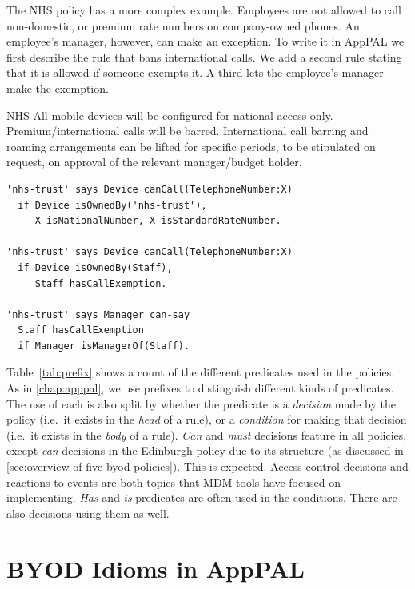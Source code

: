 \documentclass[thesis.tex]{subfiles}
\begin{document}
The NHS policy has a more complex example. Employees are not
allowed to call non-domestic, or premium rate numbers on company-owned
phones. An employee's manager, however, can make an exception.
To write it in AppPAL we first describe the
rule that bans international calls. We add a second rule stating that it is
allowed if someone exempts it. A third lets the employee's manager 
make the exemption.

\noindent\begin{minipage}{\linewidth}\vspace{1em}
\begin{policyrule}{NHS}
  All mobile devices will be configured for national access only. Premium/international calls will be barred.
  International call barring and roaming arrangements can be lifted for specific periods, to be stipulated on request, on approval of the relevant manager/budget holder.
  \normalfont
  \begin{lstlisting}
'nhs-trust' says Device canCall(TelephoneNumber:X)
  if Device isOwnedBy('nhs-trust'),
     X isNationalNumber, X isStandardRateNumber.

'nhs-trust' says Device canCall(TelephoneNumber:X)
  if Device isOwnedBy(Staff),
     Staff hasCallExemption.

'nhs-trust' says Manager can-say
  Staff hasCallExemption
  if Manager isManagerOf(Staff).
  \end{lstlisting}
\end{policyrule}
\end{minipage}

\vspace{1em}
Table~\ref{tab:prefix} shows a count of the different predicates used in the
policies. As in \autoref{chap:apppal}, we use prefixes to distinguish
different kinds of predicates. The use of each is also split by whether the
predicate is a \emph{decision} made by the policy (i.e.~it exists in the \emph{head} of a rule), or a \emph{condition} for
making that decision (i.e.~it exists in the \emph{body} of a rule). \emph{Can} and \emph{must} decisions feature in all
policies, except \emph{can} decisions in the Edinburgh policy due to
its structure (as discussed in
\autoref{sec:overview-of-five-byod-policies}). This is expected.
Access control decisions and reactions to events are both topics that
\ac{MDM} tools have focused on implementing. \emph{Has} and \emph{is} predicates
are often used in the conditions.  There are also decisions using them as well.

\section{BYOD Idioms in AppPAL}
\label{sec:common_concerns}
\end{document}
